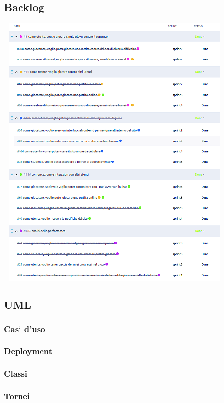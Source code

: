 \documentclass{article}
\begin{document}
\subsection{Backlog}
\includegraphics[width=12cm, height=14cm]{backlog}

\subsection{UML}
\subsubsection{Casi d'uso}

\subsubsection{Deployment}

\subsubsection{Classi}

\subsubsection{Tornei}
\end{document}
